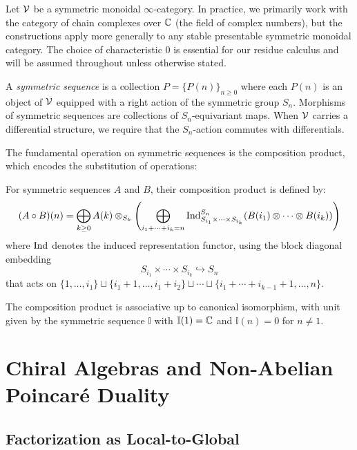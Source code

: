 \begin{example}
\begin{definition}
\end{definition}

Let $\mathcal{V}$ be a symmetric monoidal $\infty$-category. In practice, we primarily work with the category of chain complexes over $\mathbb{C}$ (the field of complex numbers), but the constructions apply more generally to any stable presentable symmetric monoidal category. The choice of characteristic 0 is essential for our residue calculus and will be assumed throughout unless otherwise stated.
 
\begin{definition}
A \emph{symmetric sequence} is a collection $P = \{P(n)\}_{n \geq 0}$ where each $P(n)$ is an object of $\mathcal{V}$ equipped with a right action of the symmetric group $S_n$. Morphisms of symmetric sequences are collections of $S_n$-equivariant maps. When $\mathcal{V}$ carries a differential structure, we require that the $S_n$-action commutes with differentials.
\end{definition}
 
The fundamental operation on symmetric sequences is the composition product, which encodes the substitution of operations:
 
\begin{definition}
For symmetric sequences $A$ and $B$, their composition product is defined by:
\[
(A \circ B)(n) = \bigoplus_{k \geq 0} A(k) \otimes_{S_k} \left( \bigoplus_{i_1 + \cdots + i_k = n} \operatorname{Ind}_{S_{i_1} \times \cdots \times S_{i_k}}^{S_n}(B(i_1) \otimes \cdots \otimes B(i_k)) \right)
\]
where $\operatorname{Ind}$ denotes the induced representation functor, using the block diagonal embedding 
\[
S_{i_1} \times \cdots \times S_{i_k} \hookrightarrow S_n
\]
that acts on $\{1, \ldots, i_1\} \sqcup \{i_1 + 1, \ldots, i_1 + i_2\} \sqcup \cdots \sqcup \{i_1 + \cdots + i_{k-1} + 1, \ldots, n\}$.
\end{definition}
 
The composition product is associative up to canonical isomorphism, with unit given by the symmetric sequence $\mathbb{I}$ with $\mathbb{I}(1) = \mathbb{C}$ and $\mathbb{I}(n) = 0$ for $n \neq 1$.
 
\section{Chiral Algebras and Non-Abelian Poincaré Duality}
\label{sec:chiral-NAP}

\subsection{Factorization as Local-to-Global}


\end{example}
